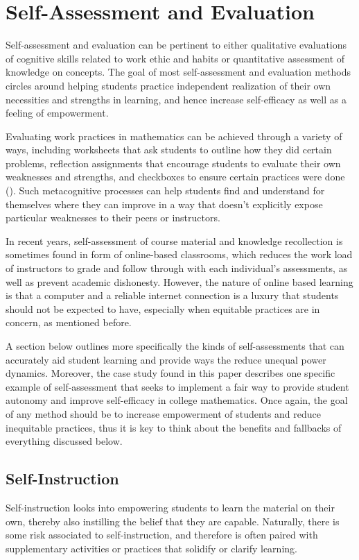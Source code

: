\section{Self-Assessment and Evaluation}
Self-assessment and evaluation can be pertinent to either qualitative evaluations of cognitive skills related to work ethic and habits or quantitative assessment of knowledge on concepts.
The goal of most self-assessment and evaluation methods circles around helping students practice independent realization of their own necessities and strengths in learning, and hence increase self-efficacy as well as a feeling of empowerment.

Evaluating work practices in mathematics can be achieved through a variety of ways, including worksheets that ask students to outline how they did certain problems, reflection assignments that encourage students to evaluate their own weaknesses and strengths, and checkboxes to ensure certain practices were done (\cite{montague_self-regulation_2007}). Such metacognitive processes can help students find and understand for themselves where they can improve in a way that doesn't explicitly expose particular weaknesses to their peers or instructors.

In recent years, self-assessment of course material and knowledge recollection is sometimes found in form of online-based classrooms, which reduces the work load of instructors to grade and follow through with each individual's assessments, as well as prevent academic dishonesty. However, the nature of online based learning is that a computer and a reliable internet connection is a luxury that students should not be expected to have, especially when equitable practices are in concern, as mentioned before.

A section below outlines more specifically the kinds of self-assessments that can accurately aid student learning and provide ways the reduce unequal power dynamics. Moreover, the case study found in this paper describes one specific example of self-assessment that seeks to implement a fair way to provide student autonomy and improve self-efficacy in college mathematics. Once again, the goal of any method should be to increase empowerment of students and reduce inequitable practices, thus it is key to think about the benefits and fallbacks of everything discussed below.

\subsection{Self-Instruction}
Self-instruction looks into empowering students to learn the material on their own, thereby also instilling the belief that they are capable. Naturally, there is some risk associated to self-instruction, and therefore is often paired with supplementary activities or practices that solidify or clarify learning.

